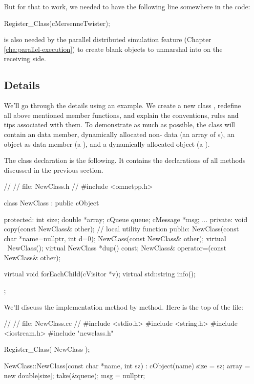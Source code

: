 But for that to work, we needed to have the following line somewhere in the code:

\begin{cpp}
Register_Class(cMersenneTwister);
\end{cpp}

 is also needed by the parallel distributed simulation feature
(Chapter \ref{cha:parallel-execution}) to create blank objects to unmarshal into
on the receiving side.


\subsection{Details}

We'll go through the details using an example. We create a new
class , redefine all above mentioned 
member functions, and explain the conventions, rules and tips
associated with them.
To demonstrate as much as possible, the class will contain
an  data member, dynamically allocated non- data
(an array of s),
an {\opp} object as data member (a ), and
a dynamically allocated {\opp} object (a ).

The class declaration is the following. It contains the declarations
of all methods discussed in the previous section.

\begin{cpp}
//
// file: NewClass.h
//
#include <omnetpp.h>

class NewClass : public cObject
{
  protected:
    int size;
    double *array;
    cQueue queue;
    cMessage *msg;
    ...
  private:
    void copy(const NewClass& other); // local utility function
  public:
    NewClass(const char *name=nullptr, int d=0);
    NewClass(const NewClass& other);
    virtual ~NewClass();
    virtual NewClass *dup() const;
    NewClass& operator=(const NewClass& other);

    virtual void forEachChild(cVisitor *v);
    virtual std::string info();
};
\end{cpp}

We'll discuss the implementation method by method.
Here is the top of the  file:

\begin{cpp}
//
// file: NewClass.cc
//
#include <stdio.h>
#include <string.h>
#include <iostream.h>
#include "newclass.h"

Register_Class( NewClass );


NewClass::NewClass(const char *name, int sz) : cObject(name)
{
    size = sz;
    array = new double[size];
    take(&queue);
    msg = nullptr;
}
\end{cpp}

